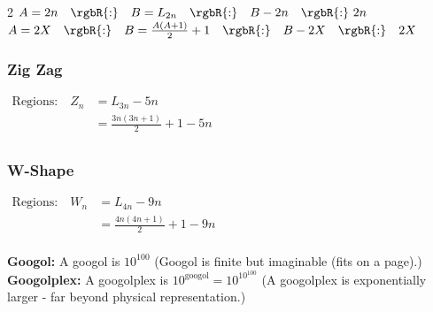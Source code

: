 \begin{multicols}{2}
$A=2n \quad \rgbR{:} \quad B = L_{2n} \quad \rgbR{:} \quad B - 2n \quad \rgbR{:} \ 2n$\\[1em]
$A=2X \quad \rgbR{:} \quad B = \frac{A(A+1)}{2}+1 \quad \rgbR{:} \quad B - 2X \quad \rgbR{:} \quad 2X$

\subsubsection{Zig Zag}
$\begin{aligned}
\text{Regions:} \quad Z_n &= L_{3n} - 5n\\
       &= \frac{3n(3n+1)}{2} + 1 - 5n \\
\end{aligned}$


\subsubsection{W-Shape}
$\begin{aligned}
\text{Regions:} \quad W_n &= L_{4n} - 9n\\
       &= \frac{4n(4n+1)}{2} + 1 - 9n \\
\end{aligned}$

\end{multicols}
   

\vspace{2em}

\textbf{Googol:} A googol is $10^{100}$ (Googol is finite but imaginable (fits on a page).)\\[1em]
\textbf{Googolplex:} A googolplex is $10^{\text{googol}} = 10^{10^{100}}$ (A googolplex is exponentially larger - far beyond physical representation.)\\[1em]
   